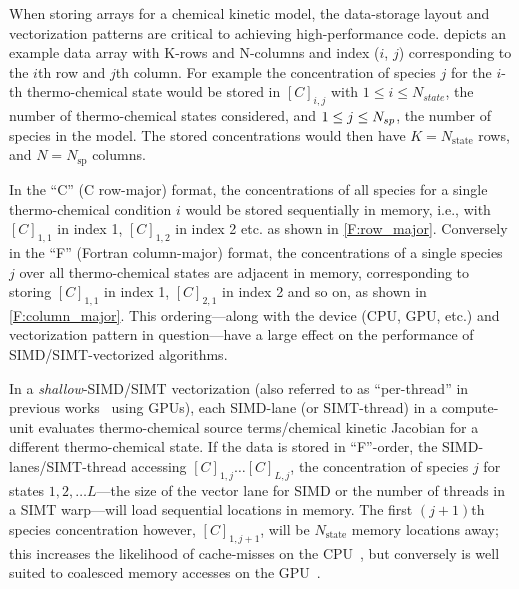 \documentclass[12pt,number,sort&compress,preprint]{elsarticle}
\begin{document}
When storing arrays for a chemical kinetic model, the data-storage layout and vectorization patterns are critical to achieving high-performance code.
 depicts an example data array with K-rows and N-columns and index ($i$, $j$) corresponding to the $i$th row and $j$th column.
For example the concentration of species $j$ for the $i$-th thermo-chemical state would be stored in $[C]_{i, j}$ with $1 \le i \le N_{state}$, the number of thermo-chemical states considered, and $1 \le j \le \ns/$, the number of species in the model.
The stored concentrations would then have $K = N_{\text{state}}$ rows, and $N = N_{\text{sp}}$ columns.

In the ``C'' (C row-major) format, the concentrations of all species for a single thermo-chemical condition $i$ would be stored sequentially in memory, i.e., with  $[C]_{1, 1}$ in index \num{1}, $[C]_{1, 2}$ in index \num{2} etc. as shown in \cref{F:row_major}.
Conversely in the ``F'' (Fortran column-major) format, the concentrations of a single species $j$ over all thermo-chemical states are adjacent in memory, corresponding to storing $[C]_{1, 1}$ in index \num{1}, $[C]_{2, 1}$ in index \num{2} and so on, as shown in \cref{F:column_major}.
This ordering---along with the device (CPU, GPU, etc.) and vectorization pattern in question---have a large effect on the performance of SIMD\slash SIMT-vectorized algorithms.

In a \textit{shallow}-SIMD\slash SIMT vectorization (also referred to as ``per-thread'' in previous works~\cite{Stone:2013aa} using GPUs), each SIMD-lane (or SIMT-thread) in a compute-unit evaluates thermo-chemical source terms\slash chemical kinetic Jacobian for a different thermo-chemical state.
If the data is stored in ``F''-order, the SIMD-lanes\slash SIMT-thread accessing $[C]_{1, j}\ldots[C]_{L, j}$, the concentration of species $j$ for states $1, 2,\ldots L$---the size of the vector lane for SIMD or the number of threads in a SIMT warp---will load sequential locations in memory.
The first $(j+1)$th species concentration however, $[C]_{1, j+1}$, will be $N_{\text{state}}$ memory locations away; this increases the likelihood of cache-misses on the CPU~\cite{gray2000rules}, but conversely is well suited to coalesced memory accesses on the GPU~\cite{NVIDIA:2018}.
\end{document}
